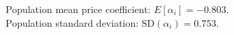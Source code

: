 Population mean price coefficient: $E[\alpha_i]=-0.803$.\\
Population standard deviation: $\mathrm{SD}(\alpha_i)=0.753$.
